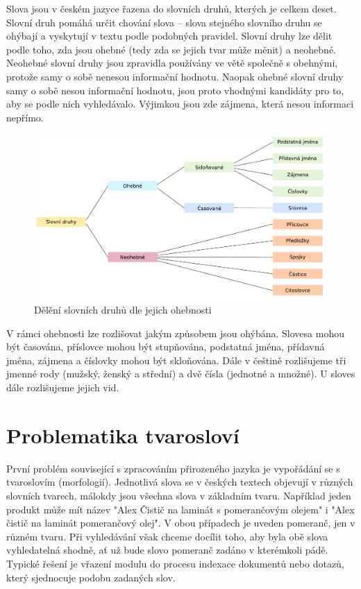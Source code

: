 \documentclass[FM,DP]{tulthesis}
\begin{document}
Slova jsou v českém jazyce řazena do slovních druhů, kterých je celkem deset.
Slovní druh pomáhá určit chování slova -- slova stejného slovního druhu se ohýbají
a vyskytují v textu podle podobných pravidel. Slovní druhy lze dělit podle
toho, zda jsou ohebné (tedy zda se jejich tvar může měnit) a neohebné.
Neohebné slovní druhy jsou zpravidla používány ve větě společně s obehnými, 
protože samy o sobě nenesou informační hodnotu. Naopak ohebné slovní druhy
samy o sobě nesou informační hodnotu, jsou proto vhodnými kandidáty pro
to, aby se podle nich vyhledávalo. Výjimkou jsou zde zájmena, která nesou 
informaci nepřímo.

\begin{figure}[h]
\center
\includegraphics[width=\textwidth]{slovni-druhy.pdf}
\caption{Dělění slovních druhů dle jejich ohebnosti}
\label{slovni-druhy}
\end{figure}

V rámci ohebnosti lze rozlišovat jakým způsobem jsou ohýbána. Slovesa mohou být
časována, příslovce mohou být stupňována, podstatná jména, přídavná jména, zájmena
a číslovky mohou být skloňována. Dále v češtině rozlišujeme tři jmenné rody
(mužský, ženský a střední) a dvě čísla (jednotné a množné). U sloves dále 
rozlišujeme jejich vid.

\section{Problematika tvarosloví}

První problém související s zpracováním přirozeného jazyka je vypořádání se s tvaroslovím
(morfologií). Jednotlivá slova se v českých textech objevují v různých slovních tvarech, 
málokdy jsou všechna slova v základním tvaru. Například jeden produkt může mít název
"Alex Čistič na laminát s pomerančovým olejem" i "Alex čistič na laminát pomerančový olej".
V obou případech je uveden pomeranč, jen v různém tvaru. Při vyhledávání však
chceme docílit toho, aby byla obě slova vyhledatelná shodně, ať už bude slovo pomeranč
zadáno v kterémkoli pádě. Typické řešení je vřazení modulu do procesu indexace dokumentů nebo 
dotazů, který sjednocuje podobu zadaných slov.
\end{document}

